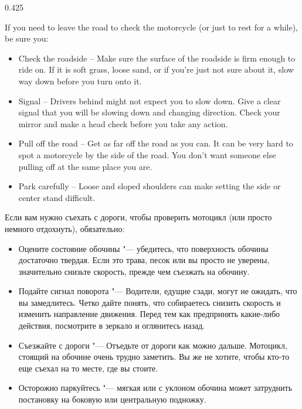 

\begin{langblock}{0.425}
	\begin{eng}
	
		If you need to leave the road to check the motorcycle (or just to rest for a while), be sure you:
		
		\begin{itemize}[noitemsep]
			\item Check the roadside -- Make sure the surface of the roadside is firm enough to ride on. If it is soft grass, loose sand, or if you're just not sure about it, slow way down before you turn onto it.
			\item Signal -- Drivers behind might not expect you to slow down. Give a clear signal that you will be slowing down and changing direction. Check your mirror and make a head check before you take any action.
			\item Pull off the road -- Get as far off the road as you can. It can be very hard to spot a motorcycle by the side of the road. You don't want someone else pulling off at the same place you are.
			\item Park carefully -- Loose and sloped shoulders can make setting the side or center stand difficult.
		\end{itemize}
	\end{eng}
	\begin{rus}
		
		Если вам нужно съехать с дороги, чтобы проверить мотоцикл (или просто немного отдохнуть), обязательно:
		
		\begin{itemize}[noitemsep]
			\item Оцените состояние обочины "--- убедитесь, что поверхность обочины достаточно твердая. Если это трава, песок или вы просто не уверены, значительно снизьте скорость, прежде чем съезжать на обочину.
			\item Подайте сигнал поворота "--- Водители, едущие сзади, могут не ожидать, что вы замедлитесь. Четко дайте понять, что собираетесь снизить скорость и изменить направление движения. Перед тем как предпринять какие-либо действия, посмотрите в зеркало и оглянитесь назад.
			\item Съезжайте с дороги "--- Отъедьте от дороги как можно дальше. Мотоцикл, стоящий на обочине очень трудно заметить. Вы же не хотите, чтобы кто-то еще съехал на то месте, где вы стоите.
			\item Осторожно паркуйтесь "--- мягкая или с уклоном обочина может затруднить постановку на боковую или центральную подножку.
		\end{itemize}
\end{rus}
\end{langblock}









